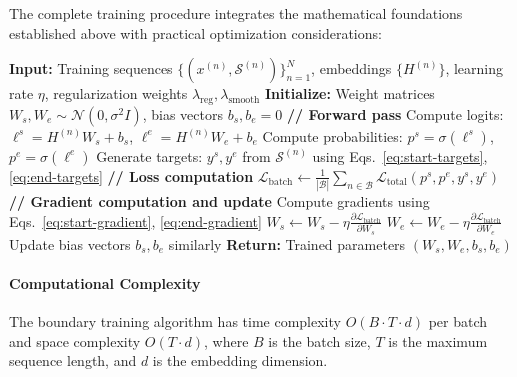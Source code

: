 The complete training procedure integrates the mathematical foundations established above with practical optimization considerations:

\begin{algorithm}[H]
	\caption{Factorized Pointer Network Boundary Training}
	\label{alg:boundary-training}
	\begin{algorithmic}[1]
		\STATE \textbf{Input:} Training sequences \(\{(x^{(n)}, \mathcal{S}^{(n)})\}_{n=1}^N\), embeddings \(\{H^{(n)}\}\), 
		\STATE \qquad learning rate \(\eta\), regularization weights \(\lambda_{\text{reg}}, \lambda_{\text{smooth}}\)
		\STATE \textbf{Initialize:} Weight matrices \(W_s, W_e \sim \mathcal{N}(0, \sigma^2 I)\), bias vectors \(b_s, b_e = 0\)
		\STATE
		\STATE \textbf{// Forward pass}
		\STATE Compute logits: \(\ell^s = H^{(n)} W_s + b_s\), \(\ell^e = H^{(n)} W_e + b_e\)
		\STATE Compute probabilities: \(p^s = \sigma(\ell^s)\), \(p^e = \sigma(\ell^e)\)
		\STATE Generate targets: \(y^s, y^e\) from \(\mathcal{S}^{(n)}\) using Eqs.~\eqref{eq:start-targets}, \eqref{eq:end-targets}
		\ENDFOR
		\STATE
		\STATE \textbf{// Loss computation}
		\STATE \(\mathcal{L}_{\text{batch}} \leftarrow \frac{1}{|\mathcal{B}|} \sum_{n \in \mathcal{B}} \mathcal{L}_{\text{total}}(p^s, p^e, y^s, y^e)\)
		\STATE
		\STATE \textbf{// Gradient computation and update}
		\STATE Compute gradients using Eqs.~\eqref{eq:start-gradient}, \eqref{eq:end-gradient}
		\STATE \(W_s \leftarrow W_s - \eta \frac{\partial \mathcal{L}_{\text{batch}}}{\partial W_s}\)
		\STATE \(W_e \leftarrow W_e - \eta \frac{\partial \mathcal{L}_{\text{batch}}}{\partial W_e}\)
		\STATE Update bias vectors \(b_s, b_e\) similarly
		\ENDFOR
		\ENDFOR
		\STATE \textbf{Return:} Trained parameters \((W_s, W_e, b_s, b_e)\)
	\end{algorithmic}
\end{algorithm}

\paragraph{Computational Complexity}

\begin{proposition}
	\label{prop:training-complexity}
	The boundary training algorithm has time complexity \(O(B \cdot T \cdot d)\) per batch and space complexity \(O(T \cdot d)\), where \(B\) is the batch size, \(T\) is the maximum sequence length, and \(d\) is the embedding dimension.
\end{proposition}

